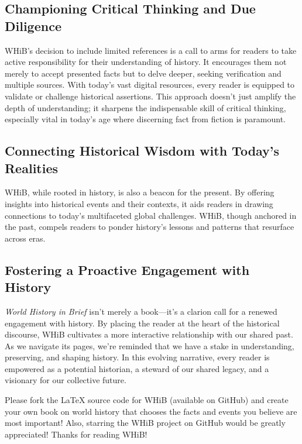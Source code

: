 \documentclass{book}
\begin{document}
\subsection*{Championing Critical Thinking and Due Diligence}

WHiB's decision to include limited references is a call to arms for readers to take active responsibility for their understanding of history. It encourages them not merely to accept presented facts but to delve deeper, seeking verification and multiple sources. With today's vast digital resources, every reader is equipped to validate or challenge historical assertions. This approach doesn't just amplify the depth of understanding; it sharpens the indispensable skill of critical thinking, especially vital in today's age where discerning fact from fiction is paramount.

\subsection*{Connecting Historical Wisdom with Today's Realities}

WHiB, while rooted in history, is also a beacon for the present. By offering insights into historical events and their contexts, it aids readers in drawing connections to today's multifaceted global challenges. WHiB, though anchored in the past, compels readers to ponder history's lessons and patterns that resurface across eras.

\subsection*{Fostering a Proactive Engagement with History}

\emph{World History in Brief} isn't merely a book—it's a clarion call for a renewed engagement with history. By placing the reader at the heart of the historical discourse, WHiB cultivates a more interactive relationship with our shared past. As we navigate its pages, we're reminded that we have a stake in understanding, preserving, and shaping history. In this evolving narrative, every reader is empowered as a potential historian, a steward of our shared legacy, and a visionary for our collective future.

\bigskip
\noindent
Please fork the LaTeX source code for WHiB (available on GitHub) and create your own book on world history that chooses the facts and events you believe are most important! Also, starring the WHiB project on GitHub would be greatly appreciated! Thanks for reading WHiB!
\end{document}
